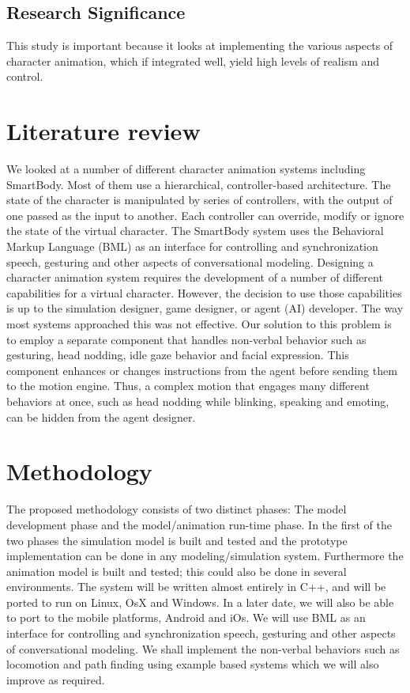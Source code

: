 \documentclass[options]{article}
\begin{document}
\subsection{\textbf{Research Significance}}
This study is important because it looks at implementing the various aspects of character animation, which if integrated well, yield high levels of realism and control.



\section{\textbf{Literature review}}
We looked at a number of different character animation systems including SmartBody. Most of them use a hierarchical, controller-based architecture. The state of the character is manipulated by series of controllers, with the output of one passed as the input to another. Each controller can override, modify or ignore the state of the virtual character. The SmartBody system uses the Behavioral Markup Language (BML) as an interface for controlling and synchronization speech, gesturing and other aspects of conversational modeling. \bigbreak
Designing a character animation system requires the development of a number of diﬀerent capabilities for a virtual character. However, the decision to use those capabilities is up to the simulation designer, game designer, or agent (AI) developer. The way most systems approached this was not effective.\bigbreak
Our solution to this problem is to employ a separate component that handles non-verbal behavior such as gesturing, head nodding, idle gaze behavior and facial expression. This component enhances or changes instructions from the agent before sending them to the motion engine. Thus, a complex motion that engages many diﬀerent behaviors at once, such as head nodding while blinking, speaking and emoting, can be hidden from the agent designer.



\section{\textbf{Methodology}}
The proposed methodology consists of two distinct phases: The model development phase and the model/animation run-time phase. In the first of the two phases the simulation model is built and tested and the prototype implementation can be done in any modeling/simulation system. Furthermore the animation model is built and tested; this could also be done in several environments. \bigbreak
The system will be written almost entirely in C++, and will be ported to run on Linux, OsX and Windows. In a later date, we will also be able to port to the mobile platforms, Android and iOs.\bigbreak
We will use BML as an interface for controlling and synchronization speech, gesturing and other aspects of conversational modeling.
We shall implement the non-verbal behaviors such as locomotion and path finding using example based systems which we will also improve as required.
\end{document}
